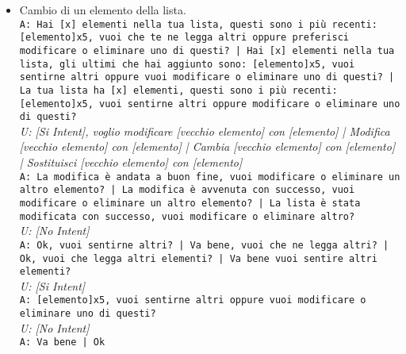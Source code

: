 \begin{itemize}
\begin{itemize}
		\item Cambio di un elemento della lista.\\
		\texttt{A: Hai [x] elementi nella tua lista, questi sono i più recenti: [elemento]x5, vuoi che te ne legga altri oppure preferisci modificare o eliminare uno di questi? | Hai [x] elementi nella tua lista, gli ultimi che hai aggiunto sono: [elemento]x5, vuoi sentirne altri oppure vuoi modificare o eliminare uno di questi? | La tua lista ha [x] elementi, questi sono i più recenti: [elemento]x5, vuoi sentirne altri oppure modificare o eliminare uno di questi? }\\
		\textit{U: [Si Intent], voglio modificare [vecchio elemento] con [elemento] | Modifica [vecchio elemento] con [elemento] | Cambia [vecchio elemento] con [elemento] | Sostituisci [vecchio elemento] con [elemento] }\\
		\texttt{A: La modifica è andata a buon fine, vuoi modificare o eliminare un altro elemento? | La modifica è avvenuta con successo, vuoi modificare o eliminare un altro elemento? | La lista è stata modificata con successo, vuoi modificare o eliminare altro?}\\
		\textit{U: [No Intent]}\\
		\texttt{A: Ok, vuoi sentirne altri? | Va bene, vuoi che ne legga altri? | Ok, vuoi che legga altri elementi? | Va bene vuoi sentire altri elementi? }\\
		\textit{U: [Si Intent] }\\
		\texttt{A: [elemento]x5, vuoi sentirne altri oppure vuoi modificare o eliminare uno di questi? }\\
		\textit{U: [No Intent]}\\
		\texttt{A: Va bene | Ok}
		

\end{itemize}
\end{itemize}
